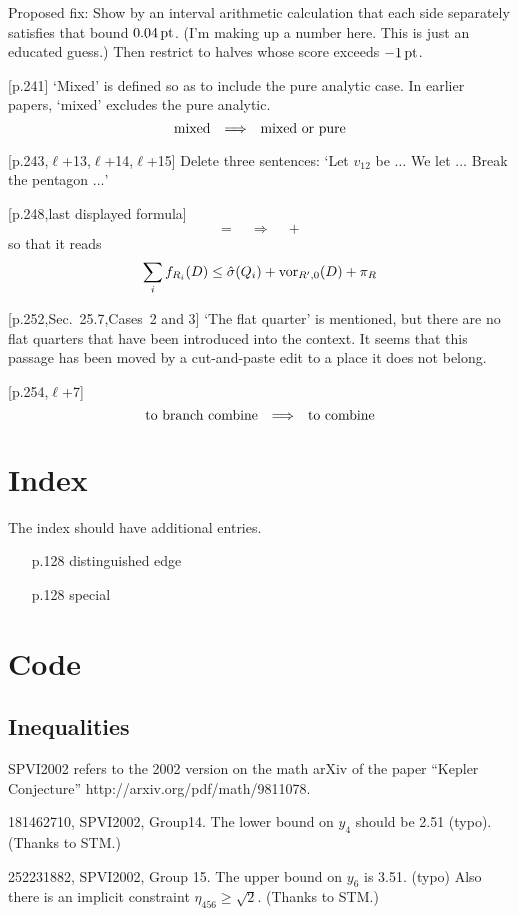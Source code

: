 \documentclass[11pt]{amsart}
\def\op#1{{\text{#1}}}
\def\to{{\quad\Longrightarrow\quad}}
\def\line{$\ell$}
\def\text{\hbox}
\begin{document}
Proposed fix: Show by an interval arithmetic
calculation that each side separately satisfies
that bound $0.04\,\text{pt}$. (I'm making up
a number here.  This is just an educated guess.)
Then restrict to halves whose score exceeds
$-1\,\text{pt}$.

[p.241]  `Mixed' is defined so as to include
the pure analytic case.  In earlier papers,
`mixed' excludes the pure analytic.  
	$$
	\text{mixed}\to\text{mixed or pure}
	$$
	
[p.243,\line+13,\line+14,\line+15]
	Delete three sentences:
	`Let $v_{12}$ be $\ldots$  We let $\ldots$
	 Break the pentagon $\ldots$'
	
[p.248,last displayed formula]  
	$$
	= \to +
	$$
so that it reads
	$$
	\sum_i f_{R_i}(D) \le \hat\sigma(Q_i) +
	\op{vor}_{R',0}(D) + \pi_R
	$$

[p.252,Sec.~25.7,Cases~2 and 3]  `The flat quarter'
is mentioned, but there are no flat quarters
that have been introduced into the context.  
It seems that this passage
has been moved by a cut-and-paste edit to a
place it does not belong.

[p.254,\line+7]
	$$
	\text{to branch combine} \to \text{to combine}
	$$




\section{Index}

The index should have additional entries.
\begin{itemize}
	\item [p.128] distinguished edge
	\item [p.128] special
\end{itemize}

\section{Code}

\subsection{Inequalities}  

SPVI2002 refers to the 2002 version on the math arXiv of the paper
``Kepler Conjecture''  http://arxiv.org/pdf/math/9811078.

181462710, SPVI2002, Group14.  The lower bound on $y_4$ should be 2.51 (typo).
(Thanks to STM.)

252231882, SPVI2002, Group 15.  The upper bound on $y_6$ is 3.51. (typo)
Also there is an implicit constraint $\eta_{456}\ge\sqrt2$.
(Thanks to STM.)
\end{document}
